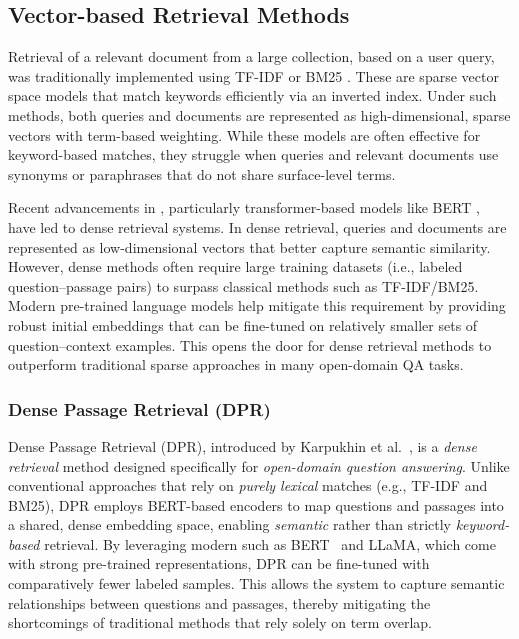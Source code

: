 \subsection{Vector-based Retrieval Methods}

Retrieval of a relevant document from a large collection, based on a user query, was traditionally implemented using TF-IDF or BM25 \cite{bm25}. These are sparse vector space models that match keywords efficiently via an inverted index. Under such methods, both queries and documents are represented as high-dimensional, sparse vectors with term-based weighting. While these models are often effective for keyword-based matches, they struggle when queries and relevant documents use synonyms or paraphrases that do not share surface-level terms.

Recent advancements in , particularly transformer-based models like BERT \cite{bertpretrainingdeepbidirectional}, have led to dense retrieval systems. In dense retrieval, queries and documents are represented as low-dimensional vectors that better capture semantic similarity. However, dense methods often require large training datasets (i.e., labeled question–passage pairs) to surpass classical methods such as TF-IDF/BM25. Modern pre-trained language models help mitigate this requirement by providing robust initial embeddings that can be fine-tuned on relatively smaller sets of question–context examples. This opens the door for dense retrieval methods to outperform traditional sparse approaches in many open-domain QA tasks.
\subsubsection{Dense Passage Retrieval (DPR)}
\label{par:dpr}
Dense Passage Retrieval (DPR), introduced by Karpukhin et al.~\cite{densepassageretrievalopendomainkarpukhin2020}, is a \textit{dense retrieval} method designed specifically for \textit{open-domain question answering}. Unlike conventional approaches that rely on \textit{purely lexical} matches (e.g., TF-IDF and BM25), DPR employs BERT-based encoders to map questions and passages into a shared, dense embedding space, enabling \textit{semantic} rather than strictly \textit{keyword-based} retrieval. By leveraging modern  such as BERT~\cite{bertpretrainingdeepbidirectional} and LLaMA, which come with strong pre-trained representations, DPR can be fine-tuned with comparatively fewer labeled samples. This allows the system to capture semantic relationships between questions and passages, thereby mitigating the shortcomings of traditional methods that rely solely on term overlap.

